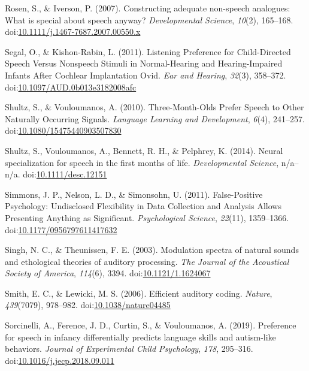 \documentclass[man]{apa6}
\begin{document}
\hypertarget{ref-rosen_constructing_2007}{}
Rosen, S., \& Iverson, P. (2007). Constructing adequate non-speech
analogues: What is special about speech anyway? \emph{Developmental
Science}, \emph{10}(2), 165--168.
doi:\href{https://doi.org/10.1111/j.1467-7687.2007.00550.x}{10.1111/j.1467-7687.2007.00550.x}

\hypertarget{ref-segal_listening_2011}{}
Segal, O., \& Kishon-Rabin, L. (2011). Listening Preference for
Child-Directed Speech Versus Nonspeech Stimuli in Normal-Hearing and
Hearing-Impaired Infants After Cochlear Implantation Ovid. \emph{Ear and
Hearing}, \emph{32}(3), 358--372.
doi:\href{https://doi.org/10.1097/AUD.0b013e3182008afc}{10.1097/AUD.0b013e3182008afc}

\hypertarget{ref-shultz_three-month-olds_2010}{}
Shultz, S., \& Vouloumanos, A. (2010). Three-Month-Olds Prefer Speech to
Other Naturally Occurring Signals. \emph{Language Learning and
Development}, \emph{6}(4), 241--257.
doi:\href{https://doi.org/10.1080/15475440903507830}{10.1080/15475440903507830}

\hypertarget{ref-shultz_neural_2014}{}
Shultz, S., Vouloumanos, A., Bennett, R. H., \& Pelphrey, K. (2014).
Neural specialization for speech in the first months of life.
\emph{Developmental Science}, n/a--n/a.
doi:\href{https://doi.org/10.1111/desc.12151}{10.1111/desc.12151}

\hypertarget{ref-simmons_false-positive_2011}{}
Simmons, J. P., Nelson, L. D., \& Simonsohn, U. (2011). False-Positive
Psychology: Undisclosed Flexibility in Data Collection and Analysis
Allows Presenting Anything as Significant. \emph{Psychological Science},
\emph{22}(11), 1359--1366.
doi:\href{https://doi.org/10.1177/0956797611417632}{10.1177/0956797611417632}

\hypertarget{ref-singh_modulation_2003}{}
Singh, N. C., \& Theunissen, F. E. (2003). Modulation spectra of natural
sounds and ethological theories of auditory processing. \emph{The
Journal of the Acoustical Society of America}, \emph{114}(6), 3394.
doi:\href{https://doi.org/10.1121/1.1624067}{10.1121/1.1624067}

\hypertarget{ref-smith_efficient_2006}{}
Smith, E. C., \& Lewicki, M. S. (2006). Efficient auditory coding.
\emph{Nature}, \emph{439}(7079), 978--982.
doi:\href{https://doi.org/10.1038/nature04485}{10.1038/nature04485}

\hypertarget{ref-sorcinelli_preference_2019}{}
Sorcinelli, A., Ference, J. D., Curtin, S., \& Vouloumanos, A. (2019).
Preference for speech in infancy differentially predicts language skills
and autism-like behaviors. \emph{Journal of Experimental Child
Psychology}, \emph{178}, 295--316.
doi:\href{https://doi.org/10.1016/j.jecp.2018.09.011}{10.1016/j.jecp.2018.09.011}
\end{document}
